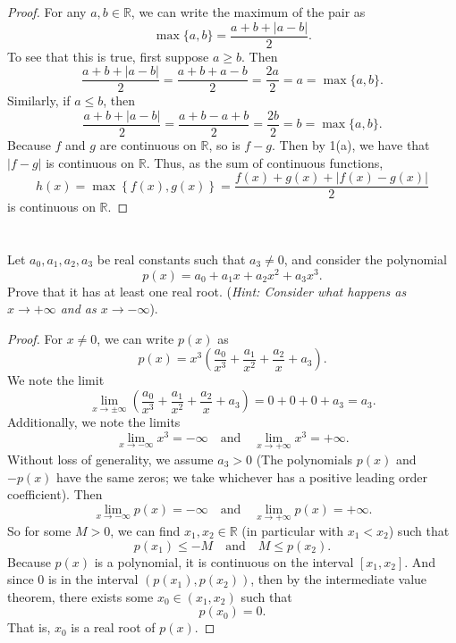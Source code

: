 \documentclass[12pt]{article}
\newenvironment{problem}
    {\begin{lrbox}{\mybox}\begin{minipage}{0.98\textwidth}}
    {\end{minipage}\end{lrbox}\framebox[\textwidth]{\usebox{\mybox}}}
\newcommand{\isp}[1]{\quad\text{#1}\quad}
\newcommand{\R}{\mathbb{R}}
\begin{document}
\begin{proof}
    For any $a, b \in \R$, we can write the maximum of the pair as
    \[
        \max\{a, b\} = \frac{a + b + |a - b|}{2}.
    \]
    To see that this is true, first suppose $a \geq b$. Then
    \[
        \frac{a + b + |a - b|}{2} = \frac{a + b + a - b}{2} = \frac{2a}{2} = a = \max\{a, b\}.
    \]
    Similarly, if $a \leq b$, then
    \[
        \frac{a + b + |a - b|}{2} = \frac{a + b - a + b}{2} = \frac{2b}{2} = b = \max\{a, b\}.
    \]
    Because $f$ and $g$ are continuous on $\R$, so is $f - g$. Then by 1(a), we have that $|f - g|$ is continuous on $\R$. Thus, as the sum of continuous functions,
    \[
        h(x) = \max \left \{ f(x),g(x)\right \} = \frac{f(x) + g(x) + |f(x) - g(x)|}{2}
    \]
    is continuous on $\R$.
    
\end{proof}

\newpage
\section{}
\begin{problem}
    Let $a_0,a_1,a_2,a_3$ be real constants such that $a_3\ne 0$, and consider the polynomial 
    \begin{equation}
        p(x) = a_0 + a_1x + a_2x^2 + a_3x^3.
    \end{equation}
    Prove that it has at least one real root. 
    ({\it Hint: Consider what happens as $x\to +\infty$ and as $x\to -\infty$}).
\end{problem}

\begin{proof}
    For $x \ne 0$, we can write $p(x)$ as
    \[
        p(x) = x^3 \left( \frac{a_0}{x^3} + \frac{a_1}{x^2} + \frac{a_2}{x} + a_3 \right).
    \]
    We note the limit
    \[
        \lim_{x \to \pm\infty} \left( \frac{a_0}{x^3} + \frac{a_1}{x^2} + \frac{a_2}{x} + a_3 \right) = 0 + 0 + 0 + a_3 = a_3.
    \]
    Additionally, we note the limits
    \[
        \lim_{x \to -\infty} x^3 = -\infty \isp{and} \lim_{x \to +\infty} x^3 = +\infty.
    \]
    Without loss of generality, we assume $a_3 > 0$ (The polynomials $p(x)$ and $-p(x)$ have the same zeros; we take whichever has a positive leading order coefficient). Then
    \[
        \lim_{x \to -\infty} p(x) = -\infty \isp{and} \lim_{x \to +\infty} p(x) = +\infty.
    \]
    So for some $M > 0$, we can find $x_1, x_2 \in \R$ (in particular with $x_1 < x_2$) such that
    \[
        p(x_1) \leq -M \isp{and} M \leq p(x_2).
    \]
    Because $p(x)$ is a polynomial, it is continuous on the interval $[x_1, x_2]$. And since $0$ is in the interval $(p(x_1), p(x_2))$, then by the intermediate value theorem, there exists some $x_0 \in (x_1, x_2)$ such that
    \[
        p(x_0) = 0.
    \]
    That is, $x_0$ is a real root of $p(x)$.
    
\end{proof}
\end{document}
